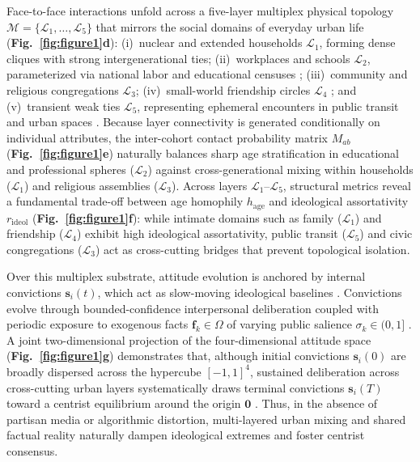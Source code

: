 \documentclass{article}
\begin{document}
Face-to-face interactions unfold across a five-layer multiplex physical topology $\mathcal{M} = \{\mathcal{L}_1, \dots, \mathcal{L}_5\}$ \citep{boccaletti2014structure, kivela2014multilayer} that mirrors the social domains of everyday urban life (\textbf{Fig.~\ref{fig:figure1}d}): (i)~nuclear and extended households $\mathcal{L}_1$, forming dense cliques with strong intergenerational ties; (ii)~workplaces and schools $\mathcal{L}_2$, parameterized via national labor and educational censuses \citep{inep2023censo, mte2023rais}; (iii)~community and religious congregations $\mathcal{L}_3$; (iv)~small-world friendship circles $\mathcal{L}_4$ \citep{watts1998collective}; and (v)~transient weak ties $\mathcal{L}_5$, representing ephemeral encounters in public transit and urban spaces \citep{granovetter1973strength, ibge2022censo}. Because layer connectivity is generated conditionally on individual attributes, the inter-cohort contact probability matrix $M_{ab}$ (\textbf{Fig.~\ref{fig:figure1}e}) naturally balances sharp age stratification in educational and professional spheres ($\mathcal{L}_2$) against cross-generational mixing within households ($\mathcal{L}_1$) and religious assemblies ($\mathcal{L}_3$). Across layers $\mathcal{L}_1$--$\mathcal{L}_5$, structural metrics reveal a fundamental trade-off between age homophily $h_{\mathrm{age}}$ and ideological assortativity $r_{\mathrm{ideol}}$ \citep{mcpherson2001birds, mullainathan2005market} (\textbf{Fig.~\ref{fig:figure1}f}): while intimate domains such as family ($\mathcal{L}_1$) and friendship ($\mathcal{L}_4$) exhibit high ideological assortativity, public transit ($\mathcal{L}_5$) and civic congregations ($\mathcal{L}_3$) act as cross-cutting bridges that prevent topological isolation.

Over this multiplex substrate, attitude evolution is anchored by internal convictions $\mathbf{s}_i(t)$, which act as slow-moving ideological baselines \citep{converse1964nature, zaller1992nature}. Convictions evolve through bounded-confidence interpersonal deliberation \citep{deffuant2000mixing, hegselmann2002opinion} coupled with periodic exposure to exogenous facts $\mathbf{f}_k \in \Omega$ of varying public salience $\sigma_k \in (0, 1]$ \citep{mullainathan2005market, gentzkow2006media}. A joint two-dimensional projection of the four-dimensional attitude space (\textbf{Fig.~\ref{fig:figure1}g}) demonstrates that, although initial convictions $\mathbf{s}_i(0)$ are broadly dispersed across the hypercube $[-1, 1]^4$, sustained deliberation across cross-cutting urban layers systematically draws terminal convictions $\mathbf{s}_i(T)$ toward a centrist equilibrium around the origin $\mathbf{0}$ \citep{castellano2009statistical}. Thus, in the absence of partisan media or algorithmic distortion, multi-layered urban mixing and shared factual reality naturally dampen ideological extremes and foster centrist consensus.
\end{document}
